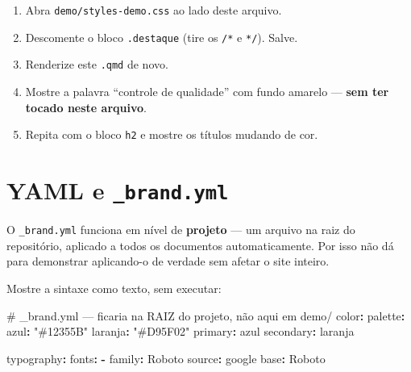 \documentclass[
  brazilian,
  11pt,
  a4paper,
]{article}
\newenvironment{Shaded}{\begin{snugshade}}{\end{snugshade}}
\newcommand{\AttributeTok}[1]{\textcolor[rgb]{0.40,0.45,0.13}{#1}}
\newcommand{\CommentTok}[1]{\textcolor[rgb]{0.37,0.37,0.37}{#1}}
\newcommand{\FunctionTok}[1]{\textcolor[rgb]{0.28,0.35,0.67}{#1}}
\newcommand{\KeywordTok}[1]{\textcolor[rgb]{0.00,0.23,0.31}{\textbf{#1}}}
\newcommand{\StringTok}[1]{\textcolor[rgb]{0.13,0.47,0.30}{#1}}
\providecommand{\tightlist}{%
  \setlength{\itemsep}{0pt}\setlength{\parskip}{0pt}}
\begin{document}
\begin{tcolorbox}[enhanced jigsaw, arc=.35mm, bottomrule=.15mm, bottomtitle=1mm, breakable, colback=white, colbacktitle=quarto-callout-important-color!10!white, colframe=quarto-callout-important-color-frame, coltitle=black, left=2mm, leftrule=.75mm, opacityback=0, opacitybacktitle=0.6, rightrule=.15mm, title=\textcolor{quarto-callout-important-color}{\faExclamation}\hspace{0.5em}{Demonstre isto ao vivo}, titlerule=0mm, toprule=.15mm, toptitle=1mm]

\begin{enumerate}
\def\labelenumi{\arabic{enumi}.}
\tightlist
\item
  Abra \texttt{demo/styles-demo.css} ao lado deste arquivo.
\item
  Descomente o bloco \texttt{.destaque} (tire os \texttt{/*} e
  \texttt{*/}). Salve.
\item
  Renderize este \texttt{.qmd} de novo.
\item
  Mostre a palavra ``controle de qualidade'' com fundo amarelo ---
  \textbf{sem ter tocado neste arquivo}.
\item
  Repita com o bloco \texttt{h2} e mostre os títulos mudando de cor.
\end{enumerate}

\end{tcolorbox}

\section{\texorpdfstring{YAML e
\texttt{\_brand.yml}}{YAML e \_brand.yml}}\label{yaml-e-_brand.yml}

O \texttt{\_brand.yml} funciona em nível de \textbf{projeto} --- um
arquivo na raiz do repositório, aplicado a todos os documentos
automaticamente. Por isso não dá para demonstrar aplicando-o de verdade
sem afetar o site inteiro.

Mostre a sintaxe como texto, sem executar:

\begin{Shaded}
\begin{Highlighting}[]
\CommentTok{\# \_brand.yml — ficaria na RAIZ do projeto, não aqui em demo/}
\FunctionTok{color}\KeywordTok{:}
\AttributeTok{  }\FunctionTok{palette}\KeywordTok{:}
\AttributeTok{    }\FunctionTok{azul}\KeywordTok{:}\AttributeTok{ }\StringTok{"\#12355B"}
\AttributeTok{    }\FunctionTok{laranja}\KeywordTok{:}\AttributeTok{ }\StringTok{"\#D95F02"}
\AttributeTok{  }\FunctionTok{primary}\KeywordTok{:}\AttributeTok{ azul}
\AttributeTok{  }\FunctionTok{secondary}\KeywordTok{:}\AttributeTok{ laranja}

\FunctionTok{typography}\KeywordTok{:}
\AttributeTok{  }\FunctionTok{fonts}\KeywordTok{:}
\AttributeTok{    }\KeywordTok{{-}}\AttributeTok{ }\FunctionTok{family}\KeywordTok{:}\AttributeTok{ Roboto}
\AttributeTok{      }\FunctionTok{source}\KeywordTok{:}\AttributeTok{ google}
\AttributeTok{  }\FunctionTok{base}\KeywordTok{:}\AttributeTok{ Roboto}
\end{Highlighting}
\end{Shaded}
\end{document}
